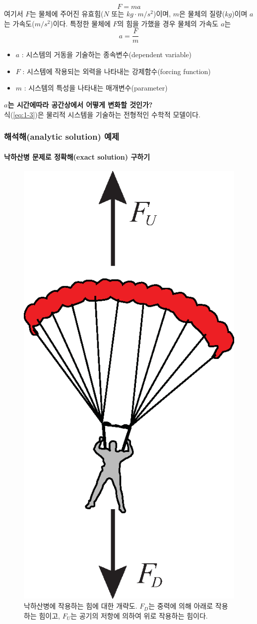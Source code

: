 \begin{equation}
F=ma
\end{equation}
여기서 $F$는 물체에 주어진 유효힘($N$ 또는 $kg\cdot m/s^2$)이며, $m$은 물체의 질량($kg$)이며 $a$는 가속도($m/s^2$)이다.
특정한 물체에 $F$의 힘을 가했을 경우 물체의 가속도 $a$는
\begin{equation}
a=\frac{F}{m}
\label{eq:1-3}
\end{equation}
\begin{itemize}
\item $a$ : 시스템의 거동을 기술하는 종속변수(dependent variable)
\item $F$ : 시스템에 작용되는 외력을 나타내는 강제함수(forcing function)
\item $m$ : 시스템의 특성을 나타내는 매개변수(parameter)
\end{itemize}
\textbf{$a$는 시간에따라 공간상에서 어떻게 변화할 것인가?}\\
식(\ref{eq:1-3})은 물리적 시스템을 기술하는 전형적인 수학적 모델이다.
\clearpage
\subsubsection{해석해(analytic solution) 예제}
\paragraph{낙하산병 문제로 정확해(exact solution) 구하기}

\begin{figure}[!hbpt]
\centering
\includegraphics[keepaspectratio=true,width=0.2\linewidth]{figs/parachute.eps}
\caption{낙하산병에 작용하는 힘에 대한 개략도. $F_D$는 중력에 의해 아래로 작용하는 힘이고, $F_U$는 공기의 저항에 의하여 위로 작용하는 힘이다.}
\label{fig:1-2}
\end{figure}

